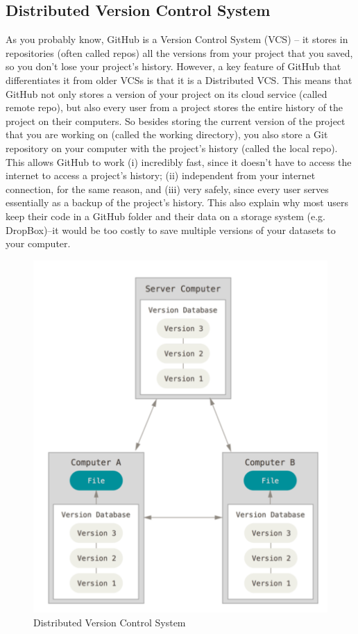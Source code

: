 \documentclass{article}
\begin{document}
\subsection{Distributed Version Control System}
	As you probably know, GitHub is a Version Control System (VCS) -- it stores in repositories (often called repos) all the versions from your project that you saved, so you don't lose your project's history. However, a key feature of GitHub that differentiates it from older VCSs is that it is a Distributed VCS. This means that GitHub not only stores a version of your project on its cloud service (called remote repo), but also every user from a project stores the entire history of the project on their computers. So besides storing the current version of the project that you are working on (called the working directory), you also store a Git repository on your computer with the project's history (called the local repo). \\
    \newline
	This allows GitHub to work (i) incredibly fast, since it doesn't have to access the internet to access a project's history; (ii) independent from your internet connection, for the same reason, and (iii) very safely, since every user serves essentially as a backup of the project's history. This also explain why most users keep their code in a GitHub folder and their data on a storage system (e.g. DropBox)--it would be too costly to save multiple versions of your datasets to your computer. \\
    
    \begin{figure}[H]
    	\caption{Distributed Version Control System}
    	\includegraphics[scale=0.3]{images/figure1.png}
	    \centering
    \end{figure}
    
\end{document}

